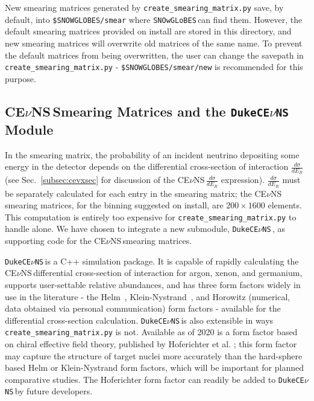 \documentclass{article}
\newcommand{\cev}{CE$\nu$NS\,}
\newcommand{\snow}{\texttt{SNOwGLoBES}\,}
\newcommand{\dukecev}{\texttt{DukeCE$\nu$NS}\,}
\begin{document}
New smearing matrices generated by \texttt{create\_smearing\_matrix.py} save, by default, into \texttt{\$SNOWGLOBES/smear} where \snow can find them. However, the default smearing matrices provided on install are stored in this directory, and new smearing matrices will overwrite old matrices of the same name. To prevent the default matrices from being overwritten, the user can change the savepath in \texttt{create\_smearing\_matrix.py} - \texttt{\$SNOWGLOBES/smear/new} is recommended for this purpose.

\subsection{\cev Smearing Matrices and the \dukecev Module} \label{subsec:cevnssmearmat}

In the smearing matrix, the probability of an incident neutrino depositing some energy in the detector depends on the differential cross-section of interaction $\frac{d\sigma}{dE_R}$ (see Sec.~\ref{subsec:cevxsec} for discussion of the \cev $\frac{d\sigma}{dE_R}$ expression). $\frac{d\sigma}{dE_R}$ must be separately calculated for each entry in the smearing matrix; the \cev smearing matrices, for the binning suggested on install, are $200 \times 1600$ elements. This computation is entirely too  expensive for \texttt{create\_smearing\_matrix.py} to handle alone. We have chosen to integrate a new submodule, \dukecev, as supporting code for the \cev smearing matrices.

\dukecev is a C++ simulation package. It is capable of rapidly calculating the \cev differential cross-section of interaction for argon, xenon, and germanium, supports user-settable relative abundances, and has three form factors widely in use in the literature - the Helm~\cite{lewin_review_1996}, Klein-Nystrand~\cite{klein_exclusive_1999}, and Horowitz (numerical, data obtained via personal communication) form factors - available for the differential cross-section calculation. \dukecev is also extensible in ways \texttt{create\_smearing\_matrix.py} is not. Available as of 2020 is a form factor based on chiral effective field theory, published by Hoferichter et al. \cite{Hoferichter_2020}; this form factor may capture the structure of target nuclei more accurately than the hard-sphere based Helm or Klein-Nystrand form factors, which will be important for planned comparative studies. The Hoferichter form factor can readily be added to \dukecev by future developers.
\end{document}

